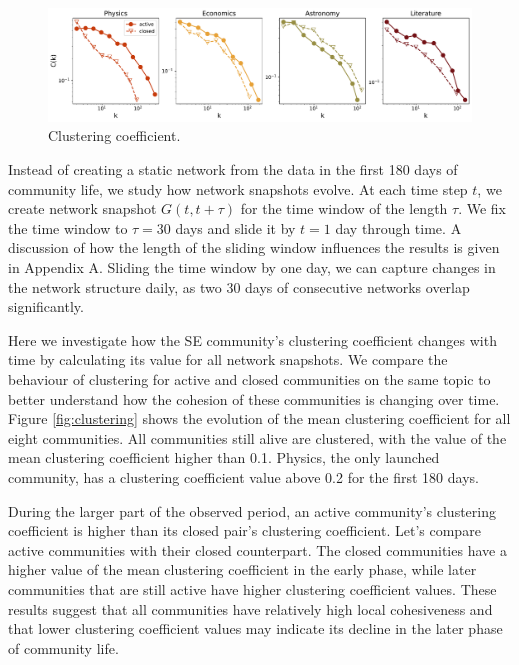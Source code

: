 \begin{figure}[h]
	\centering
	\includegraphics[width=\linewidth]{figures/stackexchange/clustering_fullnet.pdf}
	\caption{Clustering coefficient.}
	\label{fig:fullclustering}
\end{figure}

Instead of creating a static network from the data in the first 180 days of community life, we study how network snapshots evolve. At each time step $t$, we create network snapshot $G(t, t+\tau)$ for the time window of the length $\tau$. We fix the time window to $\tau=30$ days and slide it by $t=1$ day through time. A discussion of how the length of the sliding window influences the results is given in Appendix A. Sliding the time window by one day, we can capture changes in the network structure daily, as two 30 days of consecutive networks overlap significantly. 

Here we investigate how the SE community’s clustering coefficient changes with time by calculating its value for all network snapshots. We compare the behaviour of clustering for active and closed communities on the same topic to better understand how the cohesion of these communities is changing over time. Figure \ref{fig:clustering} shows the evolution of the mean clustering coefficient for all eight communities. All communities still alive are clustered, with the value of the mean clustering coefficient higher than 0.1. Physics, the only launched community, has a clustering coefficient value above 0.2 for the first 180 days.

During the larger part of the observed period, an active community’s clustering coefficient is higher than its closed pair’s clustering coefficient. Let’s compare active communities with their closed counterpart. The closed communities have a higher value of the mean clustering coefficient in the early phase, while later communities that are still active have higher clustering coefficient values. These results suggest that all communities have relatively high local cohesiveness and that lower clustering coefficient values may indicate its decline in the later phase of community life. 

